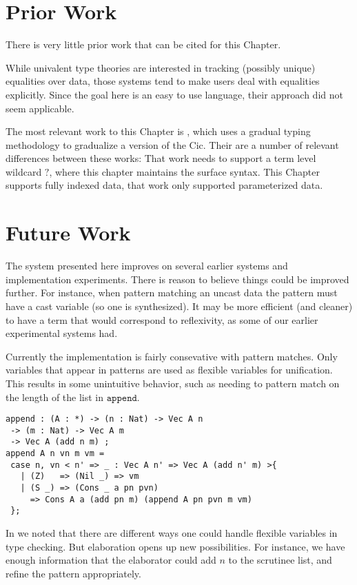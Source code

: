 
\section{Prior Work}
There is very little prior work that can be cited for this Chapter.
 
While univalent type theories are interested in tracking (possibly unique) equalities over data, those systems tend to make users deal with equalities explicitly.
Since the goal here is an easy to use language, their approach did not seem applicable.
 
The most relevant work to this Chapter is \cite{10.1145/3495528}, which uses a gradual typing methodology to gradualize a version of the \ac{Cic}.
Their are a number of relevant differences between these works:
That work needs to support a term level wildcard $?$, where this chapter maintains the surface syntax.
This Chapter supports fully indexed data, that work only supported parameterized data.

\section{Future Work}

The system presented here improves on several earlier systems and implementation experiments.
There is reason to believe things could be improved further.
For instance, when pattern matching an uncast data the pattern must have a cast variable (so one is synthesized).
It may be more efficient (and cleaner) to have a term that would correspond to reflexivity, as some of our earlier experimental systems had.

Currently the implementation is fairly consevative with pattern matches.
Only variables that appear in \case{} patterns are used as flexible variables for unification.
This results in some unintuitive behavior, such as needing to pattern match on the length of the list in $\mathtt{append}$.
\begin{lstlisting}[basicstyle={\ttfamily\small}]
append : (A : *) -> (n : Nat) -> Vec A n
 -> (m : Nat) -> Vec A m
 -> Vec A (add n m) ;
append A n vn m vm =
 case n, vn < n' => _ : Vec A n' => Vec A (add n' m) >{
   | (Z)   => (Nil _) => vm
   | (S _) => (Cons _ a pn pvn)
     => Cons A a (add pn m) (append A pn pvn m vm)
 };
\end{lstlisting}
In  we noted that there are different ways one could handle flexible variables in type checking.
But elaboration opens up new possibilities.
For instance, we have enough information that the elaborator could add $n$ to the scrutinee list, and refine the pattern appropriately.

